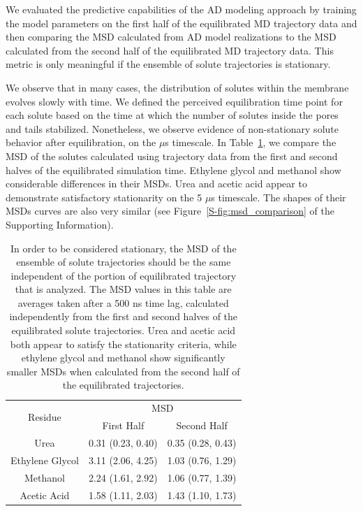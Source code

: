 \documentclass{article}
\begin{document}
  We evaluated the predictive capabilities of the AD modeling approach by training
  the model parameters on the first half of the equilibrated MD trajectory data and
  then comparing the MSD calculated from AD model realizations to the MSD calculated
  from the second half of the equilibrated MD trajectory data. This metric is
  only meaningful if the ensemble of solute trajectories is stationary.
  
  We observe that in many cases, the distribution of solutes within the membrane
  evolves slowly with time. We defined the perceived equilibration time point 
  for each solute based on the time at which the number of solutes inside the
  pores and tails stabilized. Nonetheless, we observe evidence of non-stationary
  solute behavior after equilibration, on the $\mu$s timescale. In Table~\ref{table:stationarity},
  we compare the MSD of the solutes calculated using trajectory data from the 
  first and second halves of the equilibrated simulation time. Ethylene glycol 
  and methanol show considerable differences in their MSDs. Urea and acetic acid
  appear to demonstrate satisfactory stationarity on the 5 $\mu$s timescale. The
  shapes of their MSDs curves are also very similar (see Figure~\ref{S-fig:msd_comparison}
  of the Supporting Information).
  
  \begin{table}[h]
  \centering
  \begin{tabular}{|c|c|c|}
  \hline
  \multirow{2}{*}{Residue} & \multicolumn{2}{c|}{MSD}            \\\cline{2-3}
                           & First Half       & Second Half      \\\hline
  Urea                     & 0.31 (0.23, 0.40)& 0.35 (0.28, 0.43)\\\hline
  Ethylene Glycol          & 3.11 (2.06, 4.25)& 1.03 (0.76, 1.29)\\\hline
  Methanol                 & 2.24 (1.61, 2.92)& 1.06 (0.77, 1.39)\\\hline
  Acetic Acid              & 1.58 (1.11, 2.03)& 1.43 (1.10, 1.73)\\\hline
  
  \end{tabular}
  \caption{In order to be considered stationary, the MSD of the ensemble of solute trajectories
  should be the same independent of the portion of equilibrated trajectory that is
  analyzed. The MSD values in this table are averages taken after a 500 ns time lag, 
  calculated independently from the first and second halves of the equilibrated
  solute trajectories. Urea and acetic acid both appear to satisfy the stationarity
  criteria, while ethylene glycol and methanol show significantly smaller MSDs 
  when calculated from the second half of the equilibrated trajectories.}\label{table:stationarity}
  \end{table}
  
\end{document}
